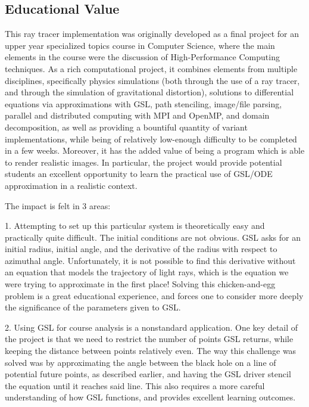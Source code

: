 \subsection{Educational Value}

This ray tracer implementation was originally developed as a final project for
an upper year specialized topics course in Computer Science, where the main
elements in the course were the discussion of High-Performance Computing
techniques.
As a rich computational project, it combines elements from multiple disciplines, specifically
physics simulations (both through the use of a ray tracer, and through the simulation of gravitational distortion),
solutions to differential equations via approximations with GSL,
path stenciling, image/file parsing,
parallel and distributed computing with MPI and OpenMP, and domain decomposition,
as well as providing a bountiful quantity of variant implementations,
while being of relatively low-enough difficulty to be completed in a few weeks.
Moreover, it has the added value of being a 
program which is able to render realistic images.
In particular, the project would provide potential students an excellent opportunity to learn the practical use of GSL/ODE approximation in a realistic context.

The impact is felt in 3 areas:

1. Attempting to set up this particular system is theoretically easy and practically quite difficult. The initial conditions are not obvious. GSL asks for an initial radius, initial angle, and the derivative of the radius with respect to azimuthal angle. Unfortunately, it is not possible to find this derivative without an equation that models the trajectory of light rays, which is the equation we were trying to approximate in the first place! Solving this chicken-and-egg problem is a great educational experience, and forces one to consider more deeply the significance of the parameters given to GSL. 

2. Using GSL for course analysis is a nonstandard application. One key detail of the project is that we need to restrict the number of points GSL returns, while keeping the distance between points relatively even. The way this challenge was solved was by approximating the angle between the black hole on a line of potential future points, as described earlier, and having the GSL driver stencil the equation until it reaches said line. This also requires a more careful understanding of how GSL functions, and provides excellent learning outcomes.

